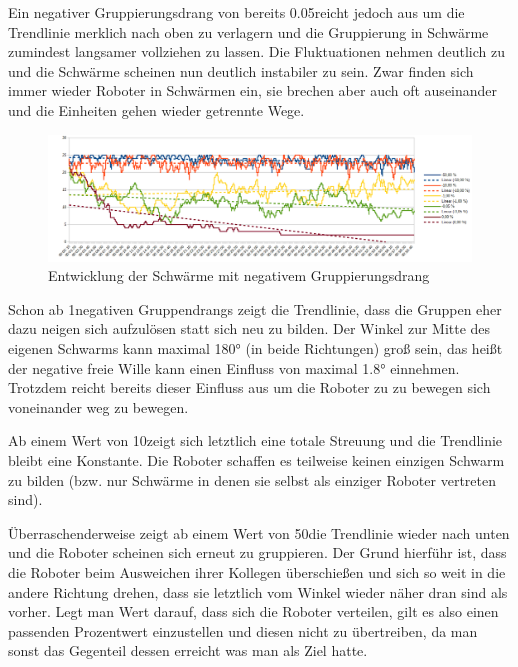 Ein negativer Gruppierungsdrang von bereits 0.05\per reicht jedoch aus um die Trendlinie merklich nach oben zu verlagern und die Gruppierung in Schwärme zumindest langsamer vollziehen zu lassen. Die Fluktuationen nehmen deutlich zu und die Schwärme scheinen nun deutlich instabiler zu sein. Zwar finden sich immer wieder Roboter in Schwärmen ein, sie brechen aber auch oft auseinander und die Einheiten gehen wieder getrennte Wege.

\begin{figure}
	\includegraphics[width=\textwidth, height=\statisticHeight]{graphics/Statistics/FlockGeneral/LocalRange1Speed01FreeWill45NegativeToFlock.png}
	\caption{Entwicklung der Schwärme mit negativem Gruppierungsdrang}
	\label{pic:NegativerGruppierungsdrang}
\end{figure}

Schon ab 1\per negativen Gruppendrangs zeigt die Trendlinie, dass die Gruppen eher dazu neigen sich aufzulösen statt sich neu zu bilden. Der Winkel zur Mitte des eigenen Schwarms kann maximal 180° (in beide Richtungen) groß sein, das heißt der negative freie Wille kann einen Einfluss von maximal 1.8° einnehmen. Trotzdem reicht bereits dieser Einfluss aus um die Roboter zu zu bewegen sich voneinander weg zu bewegen.

Ab einem Wert von 10\per zeigt sich letztlich eine totale Streuung und die Trendlinie bleibt eine Konstante. Die Roboter schaffen es teilweise keinen einzigen Schwarm zu bilden (bzw. nur Schwärme in denen sie selbst als einziger Roboter vertreten sind).

Überraschenderweise zeigt ab einem Wert von 50\per die Trendlinie wieder nach unten und die Roboter scheinen sich erneut zu gruppieren. Der Grund hierführ ist, dass die Roboter beim Ausweichen ihrer Kollegen überschießen und sich so weit in die andere Richtung drehen, dass sie letztlich vom Winkel wieder näher dran sind als vorher. Legt man Wert darauf, dass sich die Roboter verteilen, gilt es also einen passenden Prozentwert einzustellen und diesen nicht zu übertreiben, da man sonst das Gegenteil dessen erreicht was man als Ziel hatte.

